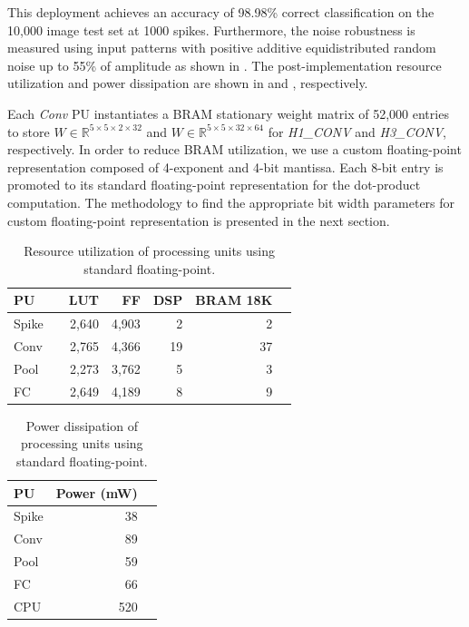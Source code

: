 This deployment achieves an accuracy of 98.98\% correct classification on the 10,000 image test set at 1000 spikes. Furthermore, the noise robustness is measured using input patterns with positive additive equidistributed random noise up to 55\% of amplitude as shown in . The post-implementation resource utilization and power dissipation are shown in  and , respectively.

Each \emph{Conv} PU instantiates a BRAM stationary weight matrix of 52,000 entries to store $W\in\mathbb{R}^{5\times 5\times 2\times 32}$ and $W\in\mathbb{R}^{5\times 5\times 32\times 64}$ for \emph{H1\_CONV} and \emph{H3\_CONV}, respectively. In order to reduce BRAM utilization, we use a custom floating-point representation composed of 4-exponent and 4-bit mantissa. Each 8-bit entry is promoted to its standard floating-point representation for the dot-product computation. The methodology to find the appropriate bit width parameters for custom floating-point representation is presented in the next section.

\begin{table}[!h]\centering
	\caption{Resource utilization of processing units using standard floating-point.}\label{tab:resource_fp}
	\scriptsize
	\begin{tabular}{lrrrrrr}\toprule
		\textbf{PU} & &\textbf{LUT} &\textbf{FF} &\textbf{DSP} &\textbf{BRAM 18K} \\\midrule
		Spike & &2,640 &4,903 &2 &2 \\
		Conv & &2,765 &4,366 &19 &37 \\
		Pool & &2,273 &3,762 &5 &3 \\
		FC & &2,649 &4,189 &8 &9 \\
		\bottomrule
	\end{tabular}
\end{table}

\begin{table}[!h]\centering
	\caption{Power dissipation of processing units using standard floating-point.}\label{tab:power_fp}
	\scriptsize
	\begin{tabular}{lrr}\toprule
		\textbf{PU} &\textbf{Power (mW)} \\\midrule
		Spike &38 \\
		Conv &89 \\
		Pool &59 \\
		FC &66 \\
		CPU &520 \\
		\bottomrule
	\end{tabular}
\end{table}

